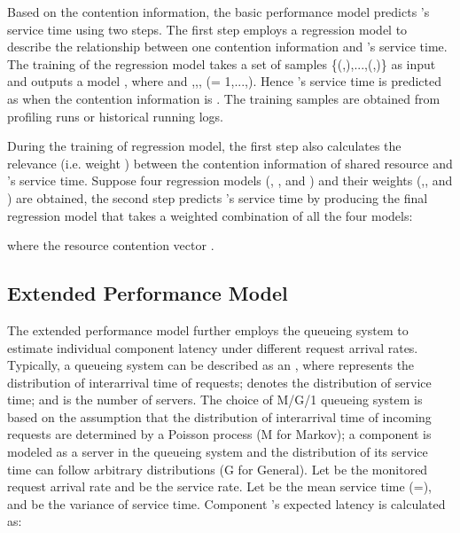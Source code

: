 \documentclass[10pt, conference, compsocconf]{IEEEtran}
\begin{document}
Based on the contention information, the basic performance model predicts 's service time  using two steps. The first step employs a regression model to describe the relationship between one contention information and 's service time.
The training of the regression model takes a set of  samples \{({,}),...,({,})\} as input and outputs a model , where  and ,,, (= 1,...,). Hence 's service time  is predicted as  when the contention information is . The training samples are obtained from profiling runs or historical running logs.













During the training of regression model, the first step also calculates the relevance (i.e. weight ) between the contention information of shared resource  and 's service time.
Suppose four regression models (, ,  and ) and their weights (,, and ) are obtained, the second step predicts 's service time  by producing the final regression model  that takes a weighted combination of all the four models:


where the resource contention vector .

















\subsection{Extended Performance Model} \label{Section: Extended Performance Model}





The extended performance model further employs the queueing system to estimate individual component latency under different request arrival rates.
Typically, a queueing system can be described as an , where  represents the distribution of interarrival time of requests;  denotes the distribution of service time; and  is the number of servers.
The choice of M/G/1 queueing system is based on the assumption that the distribution of interarrival time of incoming requests are determined by a Poisson process (M for Markov); a component is modeled as a server in the queueing system and the distribution of its service time can follow arbitrary distributions (G for General). Let  be the monitored request arrival rate and  be the service rate. Let  be the mean service time (=), and  be the variance of service time. Component 's expected latency  is calculated as:
\end{document}

